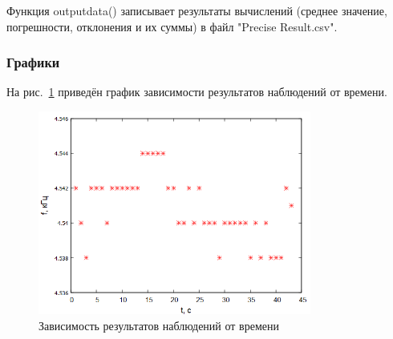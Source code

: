 Функция outputdata() записывает результаты вычислений (среднее значение, погрешности, отклонения и их суммы) в файл "Precise Result.csv".


\subsubsection{Графики}

На рис.~\ref{fig:graph1} приведён график зависимости результатов наблюдений от времени.
\begin{figure}[H]
\centering
\includegraphics[width=0.8\textwidth]{graph1}
\caption{Зависимость результатов наблюдений от времени}
\label{fig:graph1}
\end{figure}

